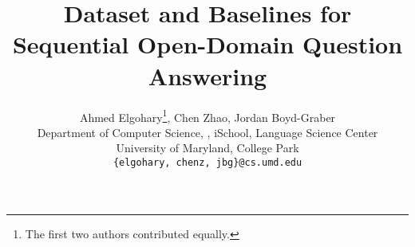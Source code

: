 \documentclass[11pt,a4paper]{article}
\title{Dataset and Baselines for Sequential Open-Domain Question Answering}
\author{
 Ahmed Elgohary\thanks{\hspace{1.5mm}The first two authors contributed equally.}, Chen Zhao\footnotemark[1],  Jordan Boyd-Graber\\
Department of Computer Science, \abr{umiacs}, iSchool, Language
Science Center \\
University of Maryland, College Park\\
  {\tt \{elgohary, chenz, jbg\}@cs.umd.edu}
}
\newcommand{\latexfile}[1]{}
\begin{document}
\maketitle


\latexfile{00-abstract}
\latexfile{10-intro}
\latexfile{20-task}
\latexfile{30-data}
\newpage
\latexfile{40-baseline}
\latexfile{50-exper}
\latexfile{60-related}
\latexfile{70-conclusions}
\latexfile{acknowledgment}





\end{document}
